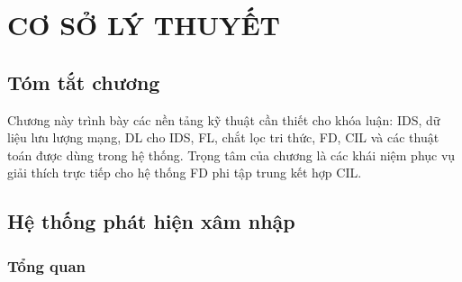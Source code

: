 \chapter{CƠ SỞ LÝ THUYẾT}\label{Chapter2}

\section*{Tóm tắt chương}

Chương này trình bày các nền tảng kỹ thuật cần thiết cho khóa luận: IDS, dữ liệu lưu lượng mạng, DL cho IDS, FL, chắt lọc tri thức, FD, CIL và các thuật toán được dùng trong hệ thống. Trọng tâm của chương là các khái niệm phục vụ giải thích trực tiếp cho hệ thống FD phi tập trung kết hợp CIL.

\section{Hệ thống phát hiện xâm nhập}

\subsection{Tổng quan}


